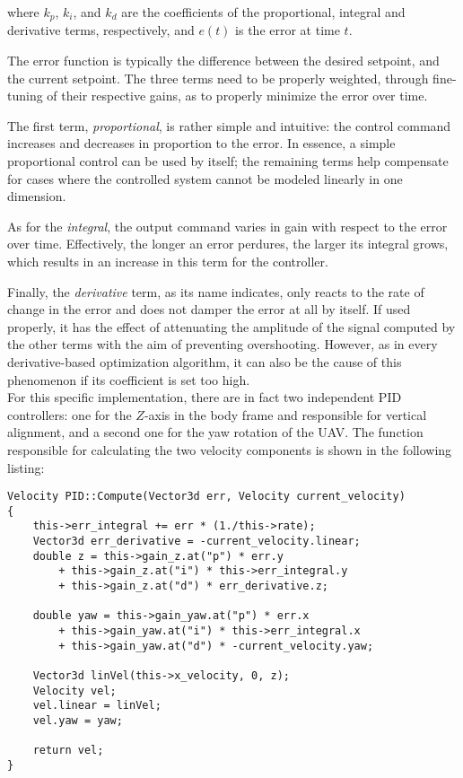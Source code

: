 where $k_p$, $k_i$, and $k_d$ are the coefficients of the proportional,
integral and derivative terms, respectively, and $e(t)$ is the error at time
$t$.

The error function is typically the difference between the desired setpoint,
and the current setpoint. The three terms need to be properly weighted, through
fine-tuning of their respective gains, as to properly minimize the error
over time.

The first term, \emph{proportional}, is rather simple and intuitive: the
control command increases and decreases in proportion to the error. In essence,
a simple proportional control can be used by itself; the remaining terms help
compensate for cases where the controlled system cannot be modeled linearly
in one dimension.

As for the \emph{integral}, the output command varies in gain with respect to
the error over time. Effectively, the longer an error perdures, the larger its
integral grows, which results in an increase in this term for the controller.

Finally, the \emph{derivative} term, as its name indicates, only reacts to the
rate of change in the error and does not damper the error at all by itself.
If used properly, it has the effect of attenuating the amplitude of the signal
computed by the other terms with the aim of preventing overshooting. However,
as in every derivative-based optimization algorithm, it can also be the cause
of this phenomenon if its coefficient is set too high.\\

For this specific implementation, there are in fact two independent PID
controllers: one for the $Z$-axis in the body frame and responsible for
vertical alignment, and a second one for the yaw rotation of the UAV. The
function responsible for calculating the two velocity components is shown in
the following listing:

\begin{lstlisting} 
Velocity PID::Compute(Vector3d err, Velocity current_velocity)
{
	this->err_integral += err * (1./this->rate);
	Vector3d err_derivative = -current_velocity.linear;
	double z = this->gain_z.at("p") * err.y
		+ this->gain_z.at("i") * this->err_integral.y
		+ this->gain_z.at("d") * err_derivative.z;

	double yaw = this->gain_yaw.at("p") * err.x
		+ this->gain_yaw.at("i") * this->err_integral.x
		+ this->gain_yaw.at("d") * -current_velocity.yaw;

	Vector3d linVel(this->x_velocity, 0, z);
	Velocity vel;
	vel.linear = linVel;
	vel.yaw = yaw;

	return vel;
}
\end{lstlisting}
